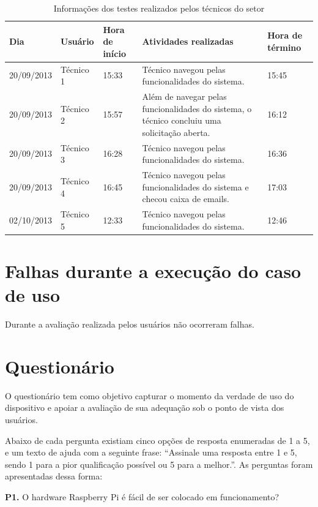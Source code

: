 \begin{table}[!htpb]
 \centering
    \begin{tabular}{|p{2cm}|p{2cm}|p{2cm}|p{5cm}|p{2cm}|} 
    \hline
        \textbf{Dia} & \textbf{Usuário} & \textbf{Hora de início} & \textbf{Atividades realizadas} &  \textbf{Hora de término} \\
    \hline
         20/09/2013 & Técnico 1 & 15:33 & Técnico navegou pelas funcionalidades do sistema. & 15:45 \\
    \hline
        20/09/2013 & Técnico 2 & 15:57 & Além de navegar pelas funcionalidades do sistema, o técnico concluiu uma solicitação aberta. & 16:12 \\
    \hline
        20/09/2013 & Técnico 3 & 16:28 & Técnico navegou pelas funcionalidades do sistema. & 16:36 \\
    \hline
        20/09/2013 & Técnico 4 & 16:45 & Técnico navegou pelas funcionalidades do sistema e checou caixa de emails. & 17:03 \\
    \hline
        02/10/2013 & Técnico 5 & 12:33 & Técnico navegou pelas funcionalidades do sistema. & 12:46 \\
    \hline
    \end{tabular}
    \caption{Informações dos testes realizados pelos técnicos do setor}
    \label{t_fixa}
\end{table}

\section{Falhas durante a execução do caso de uso}

Durante a avaliação realizada pelos usuários não ocorreram falhas.

\section{Questionário}

O questionário tem como objetivo capturar o momento da verdade de uso do dispositivo e apoiar a avaliação de sua adequação sob o ponto de vista dos usuários.

Abaixo de cada pergunta existiam cinco opções de resposta enumeradas de 1 a 5, e um texto de ajuda com a seguinte frase: “Assinale uma resposta entre 1 e 5, sendo 1 para a pior qualificação possível ou 5 para a melhor.”.
As perguntas foram apresentadas dessa forma:

\textbf{P1.} O hardware Raspberry Pi é fácil de ser colocado em funcionamento?

